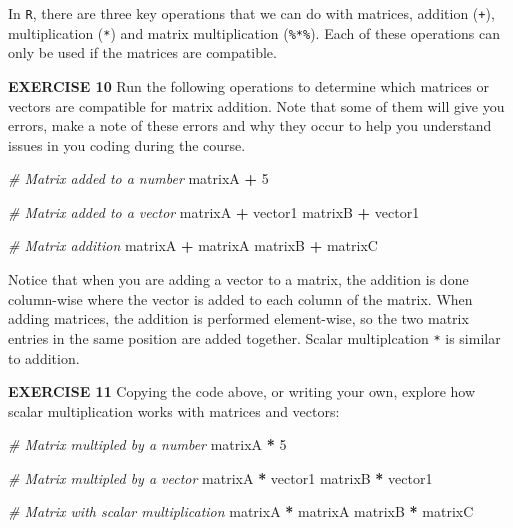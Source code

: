 \documentclass[
]{article}
\newenvironment{Shaded}{\begin{snugshade}}{\end{snugshade}}
\newcommand{\CommentTok}[1]{\textcolor[rgb]{0.56,0.35,0.01}{\textit{#1}}}
\newcommand{\DecValTok}[1]{\textcolor[rgb]{0.00,0.00,0.81}{#1}}
\newcommand{\NormalTok}[1]{#1}
\newcommand{\OperatorTok}[1]{\textcolor[rgb]{0.81,0.36,0.00}{\textbf{#1}}}
\newcommand{\StringTok}[1]{\textcolor[rgb]{0.31,0.60,0.02}{#1}}
\begin{document}
In \texttt{R}, there are three key operations that we can do with
matrices, addition (\texttt{+}), multiplication (\texttt{*}) and matrix
multiplication (\texttt{\%*\%}). Each of these operations can only be
used if the matrices are compatible.

\textbf{EXERCISE 10} Run the following operations to determine which
matrices or vectors are compatible for matrix addition. Note that some
of them will give you errors, make a note of these errors and why they
occur to help you understand issues in you coding during the course.

\begin{Shaded}
\begin{Highlighting}[]
\CommentTok{# Matrix added to a number}
\NormalTok{matrixA }\OperatorTok{+}\StringTok{ }\DecValTok{5}

\CommentTok{# Matrix added to a vector}
\NormalTok{matrixA }\OperatorTok{+}\StringTok{ }\NormalTok{vector1}
\NormalTok{matrixB }\OperatorTok{+}\StringTok{ }\NormalTok{vector1}

\CommentTok{# Matrix addition}
\NormalTok{matrixA }\OperatorTok{+}\StringTok{ }\NormalTok{matrixA}
\NormalTok{matrixB }\OperatorTok{+}\StringTok{ }\NormalTok{matrixC}
\end{Highlighting}
\end{Shaded}

Notice that when you are adding a vector to a matrix, the addition is
done column-wise where the vector is added to each column of the matrix.
When adding matrices, the addition is performed element-wise, so the two
matrix entries in the same position are added together. Scalar
multiplcation \texttt{*} is similar to addition.

\textbf{EXERCISE 11} Copying the code above, or writing your own,
explore how scalar multiplication works with matrices and vectors:

\begin{Shaded}
\begin{Highlighting}[]
\CommentTok{# Matrix multipled by a number}
\NormalTok{matrixA }\OperatorTok{*}\StringTok{ }\DecValTok{5}

\CommentTok{# Matrix multipled by a vector}
\NormalTok{matrixA }\OperatorTok{*}\StringTok{ }\NormalTok{vector1}
\NormalTok{matrixB }\OperatorTok{*}\StringTok{ }\NormalTok{vector1}

\CommentTok{# Matrix with scalar multiplication}
\NormalTok{matrixA }\OperatorTok{*}\StringTok{ }\NormalTok{matrixA}
\NormalTok{matrixB }\OperatorTok{*}\StringTok{ }\NormalTok{matrixC}
\end{Highlighting}
\end{Shaded}
\end{document}
